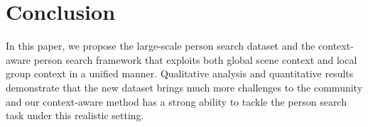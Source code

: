 \documentclass{article}
\begin{document}
\section{Conclusion}
In this paper, we propose the large-scale person search dataset and the context-aware person search framework that exploits both global scene context and local group context in a unified manner. Qualitative analysis and quantitative results demonstrate that the new dataset brings much more challenges to the community and our context-aware method has a strong ability to tackle the person search task under this realistic setting.




\end{document}
